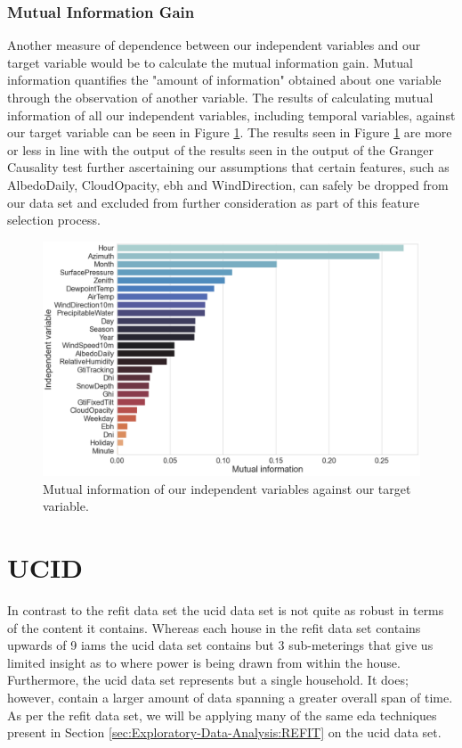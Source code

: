 \subsubsection{Mutual Information Gain}
\label{subsubsec:Exploratory-Data-Analysis:REFIT:Causality-and-Correlation:Mutual-Information-Gain}
Another measure of dependence between our independent variables and our target variable would be to calculate the mutual information gain. Mutual information quantifies the "amount of information" obtained about one variable through the observation of another variable. The results of calculating mutual information of all our independent variables, including temporal variables, against our target variable can be seen in Figure \ref{fig:REFIT-House-12-Mutual-Information-Gain}. The results seen in Figure \ref{fig:REFIT-House-12-Mutual-Information-Gain} are more or less in line with the output of the results seen in the output of the Granger Causality test further ascertaining our assumptions that certain features, such as AlbedoDaily, CloudOpacity, \gls{ebh} and WindDirection, can safely be dropped from our data set and excluded from further consideration as part of this feature selection process.

\begin{figure}[H]
    \centering
    \includegraphics[width=\textwidth]{Images/Chapter 5/REFIT/REFIT-House-12-Mutual-Information.pdf}
    \caption{Mutual information of our independent variables against our target variable.}
    \label{fig:REFIT-House-12-Mutual-Information-Gain}
\end{figure}

\section{UCID}
\label{sec:Exploratory-Data-Analysis:UCID}
In contrast to the \gls{refit} data set the \gls{ucid} data set is not quite as robust in terms of the content it contains. Whereas each house in the \gls{refit} data set contains upwards of 9 \glspl{iam} the \gls{ucid} data set contains but 3 sub-meterings that give us limited insight as to where power is being drawn from within the house. Furthermore, the \gls{ucid} data set represents but a single household. It does; however, contain a larger amount of data spanning a greater overall span of time. As per the \gls{refit} data set, we will be applying many of the same \gls{eda} techniques present in Section \ref{sec:Exploratory-Data-Analysis:REFIT} on the \gls{ucid} data set.

